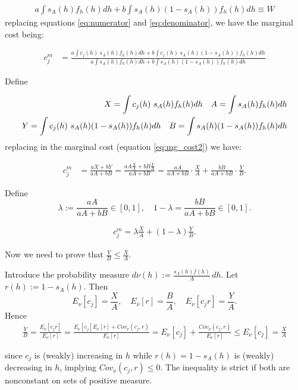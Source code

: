 \documentclass[12pt]{article}
\theoremstyle{plain}
\theoremstyle{plain}
\begin{document}
\begin{align}\label{eq:denominator}
    a \int s_A(h) f_h(h) dh +b \int s_A(h)    (1-s_A(h))  f_h(h) dh  \equiv W
\end{align}
replacing equations \ref{eq:numerator} and \ref{eq:denominator}, we have the marginal cost being: 

\begin{align}\label{eq:mg_cost2}
    c^m_j 
    &= \frac{a \int c_j(h)  \ s_A(h) f_h(h) dh +b \int c_j(h) \ s_A(h)    (1-s_A(h))  f_h(h) dh  }{a \int s_A(h) f_h(h) dh +b \int s_A(h)    (1-s_A(h))  f_h(h) dh }
\end{align}


Define

\begin{align}\label{eq:definitions}
X =   \int c_j(h)  \ s_A(h) f_h(h) dh \quad 
A =   \int s_A(h) f_h(h) dh \notag \\
Y =   \int c_j(h)  \ s_A(h) (1-s_A(h)) f_h(h) dh \quad 
B =   \int s_A(h) (1-s_A(h)) f_h(h) dh 
\end{align}
 replacing in the marginal cost (equation \ref{eq:mg_cost2}) we have: 

 \begin{align}\label{eq:37}
    c^m_j 
    &= \frac{a X +b Y }{aA + bB } = \frac{aA\frac{X}{A}+bB\frac{Y}{B}}{aA+bB} = \frac{aA}{aA+bB}\cdot\frac{X}{A} + \frac{bB}{aA+bB}\cdot\frac{Y}{B}.
\end{align}


Define
$$ \lambda := \frac{aA}{aA+bB} \in [0,1], \quad 1-\lambda = \frac{bB}{aA+bB} \in [0,1].$$

\begin{align}
    c^m_j = \lambda \frac{X}{A} + (1-\lambda)\frac{Y}{B}.
\end{align}

Now we need to prove that $\frac{Y}{B} \le \frac{X}{A}$. 

Introduce the probability measure $d\nu(h) := \frac{s_A(h)f(h)}{A}\,dh$.
Let $r(h) := 1-s_A(h)$. Then
$$E_{\nu}[c_j] = \frac{X}{A}, \quad E_{\nu}[r] = \frac{B}{A}, \quad E_{\nu}[c_j r] = \frac{Y}{A}.$$
Hence
\begin{align}\label{eq:39}
   \frac{Y}{B} = \frac{E_{\nu}[c_j r]}{E_{\nu}[r]} = \frac{E_{\nu}[c_j]E_{\nu}[r] + Cov_{\nu}(c_j,r)}{E_{\nu}[r]} = E_{\nu}[c_j] + \frac{Cov_{\nu}(c_j,r)}{E_{\nu}[r]} \le E_{\nu}[c_j] = \frac{X}{A} 
\end{align} 

since $c_j$ is (weakly) increasing in $h$ while $r(h)=1-s_A(h)$ is (weakly) decreasing in $h$, implying $Cov_{\nu}(c_j,r) \le 0$. The inequality is strict if both are nonconstant on sets of positive measure.
\end{document}
